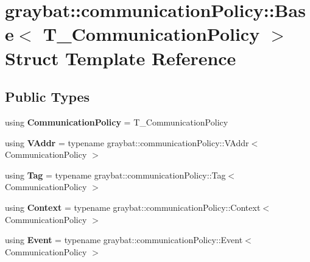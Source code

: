 \hypertarget{structgraybat_1_1communicationPolicy_1_1Base}{}\section{graybat\+:\+:communication\+Policy\+:\+:Base$<$ T\+\_\+\+Communication\+Policy $>$ Struct Template Reference}
\label{structgraybat_1_1communicationPolicy_1_1Base}
\subsection*{Public Types}
\begin{DoxyCompactItemize}
\item 
\hypertarget{structgraybat_1_1communicationPolicy_1_1Base_a8809cc88306f4411eff43b185d4a12ba}{}using {\bfseries Communication\+Policy} = T\+\_\+\+Communication\+Policy\label{structgraybat_1_1communicationPolicy_1_1Base_a8809cc88306f4411eff43b185d4a12ba}

\item 
\hypertarget{structgraybat_1_1communicationPolicy_1_1Base_a61555bfaae515788f4832c0f78bc36f4}{}using {\bfseries V\+Addr} = typename graybat\+::communication\+Policy\+::\+V\+Addr$<$ Communication\+Policy $>$\label{structgraybat_1_1communicationPolicy_1_1Base_a61555bfaae515788f4832c0f78bc36f4}

\item 
\hypertarget{structgraybat_1_1communicationPolicy_1_1Base_aced4ab808a9c345a0e698d21736f3a2c}{}using {\bfseries Tag} = typename graybat\+::communication\+Policy\+::\+Tag$<$ Communication\+Policy $>$\label{structgraybat_1_1communicationPolicy_1_1Base_aced4ab808a9c345a0e698d21736f3a2c}

\item 
\hypertarget{structgraybat_1_1communicationPolicy_1_1Base_a12a885bada327fddc91cfe4515af6471}{}using {\bfseries Context} = typename graybat\+::communication\+Policy\+::\+Context$<$ Communication\+Policy $>$\label{structgraybat_1_1communicationPolicy_1_1Base_a12a885bada327fddc91cfe4515af6471}

\item 
\hypertarget{structgraybat_1_1communicationPolicy_1_1Base_a2fc51f670372dfb2d7f8474a5a0f5e89}{}using {\bfseries Event} = typename graybat\+::communication\+Policy\+::\+Event$<$ Communication\+Policy $>$\label{structgraybat_1_1communicationPolicy_1_1Base_a2fc51f670372dfb2d7f8474a5a0f5e89}

\end{DoxyCompactItemize}
